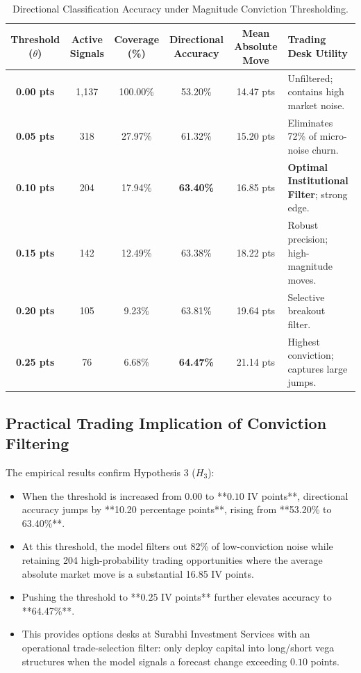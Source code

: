 \begin{table}[H]
    \centering
    \scriptsize
    \renewcommand{\arraystretch}{0.88}
    \caption{Directional Classification Accuracy under Magnitude Conviction Thresholding.}
    \label{tab:conviction_threshold_results}
    \begin{tabularx}{\textwidth}{cccccX}
        \toprule
        \textbf{Threshold ($\theta$)} & \textbf{Active Signals} & \textbf{Coverage (\%)} & \textbf{Directional Accuracy} & \textbf{Mean Absolute Move} & \textbf{Trading Desk Utility} \\
        \midrule
        \textbf{0.00 pts} & 1,137 & 100.00\% & 53.20\% & 14.47 pts & Unfiltered; contains high market noise. \\
        \textbf{0.05 pts} & 318 & 27.97\% & 61.32\% & 15.20 pts & Eliminates 72\% of micro-noise churn. \\
        \textbf{0.10 pts} & 204 & 17.94\% & \textbf{63.40\%} & 16.85 pts & \textbf{Optimal Institutional Filter}; strong edge. \\
        \textbf{0.15 pts} & 142 & 12.49\% & 63.38\% & 18.22 pts & Robust precision; high-magnitude moves. \\
        \textbf{0.20 pts} & 105 & 9.23\% & 63.81\% & 19.64 pts & Selective breakout filter. \\
        \textbf{0.25 pts} & 76 & 6.68\% & \textbf{64.47\%} & 21.14 pts & Highest conviction; captures large jumps. \\
        \bottomrule
    \end{tabularx}
\end{table}

\subsection{Practical Trading Implication of Conviction Filtering}
The empirical results confirm Hypothesis 3 ($H_3$):
\begin{itemize}
    \item When the threshold is increased from $0.00$ to **$0.10$ IV points**, directional accuracy jumps by **10.20 percentage points**, rising from **53.20\% to 63.40\%**.
    \item At this threshold, the model filters out 82\% of low-conviction noise while retaining 204 high-probability trading opportunities where the average absolute market move is a substantial 16.85 IV points.
    \item Pushing the threshold to **$0.25$ IV points** further elevates accuracy to **64.47\%**.
    \item This provides options desks at Surabhi Investment Services with an operational trade-selection filter: only deploy capital into long/short vega structures when the model signals a forecast change exceeding $0.10$ points.
\end{itemize}

